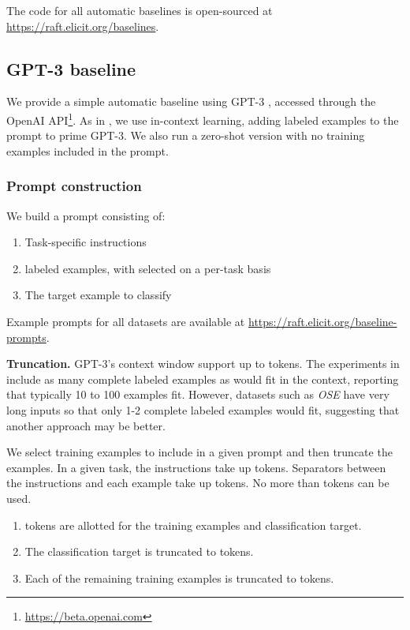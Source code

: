\documentclass{article}
\newcommand{\baselinesURL}{\href{https://raft.elicit.org/baselines}{https://raft.elicit.org/baselines}}
\begin{document}
The code for all automatic baselines is open-sourced at \baselinesURL{}.

\subsection{GPT-3 baseline}

We provide a simple automatic baseline using GPT-3 \citep{brown2020gpt3}, accessed through the OpenAI API\footnote{\href{https://beta.openai.com}{https://beta.openai.com}}. As in \citet{brown2020gpt3}, we use in-context learning, adding labeled examples to the prompt to prime GPT-3. We also run a zero-shot version with no training examples included in the prompt.

\subsubsection{Prompt construction}

We build a prompt consisting of:
\begin{enumerate}
    \item Task-specific instructions
    \item  labeled examples, with  selected on a per-task basis
    \item The target example to classify
\end{enumerate}

Example prompts for all datasets are available at \href{https://raft.elicit.org/baseline-prompts}{https://raft.elicit.org/baseline-prompts}.

\textbf{Truncation.} GPT-3's context window support up to  tokens. The experiments in \citet{brown2020gpt3} include as many complete labeled examples as would fit in the context, reporting that typically 10 to 100 examples fit. However, datasets such as \textit{OSE} have very long inputs so that only 1-2 complete labeled examples would fit, suggesting that another approach may be better. 

We select  training examples to include in a given prompt and then truncate the examples. In a given task, the instructions take up  tokens. Separators between the instructions and each example take up  tokens. No more than  tokens can be used. 
\begin{enumerate}
    \item  tokens are allotted for the training examples and classification target.
    \item The classification target is truncated to  tokens. 
    \item Each of the  remaining training examples is truncated to  tokens. 
\end{enumerate}
\end{document}
